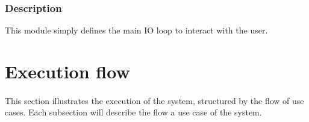 \documentclass[../gr-final.tex]{subfiles}
\begin{document}
\subsubsection{Description}
This module simply defines the main IO loop to interact with the
user.


\section{Execution flow}
\paragraph{} This section illustrates the execution of the
system, structured by the flow of use cases. Each subsection will describe the 
flow a use case of the system. 
\end{document}
